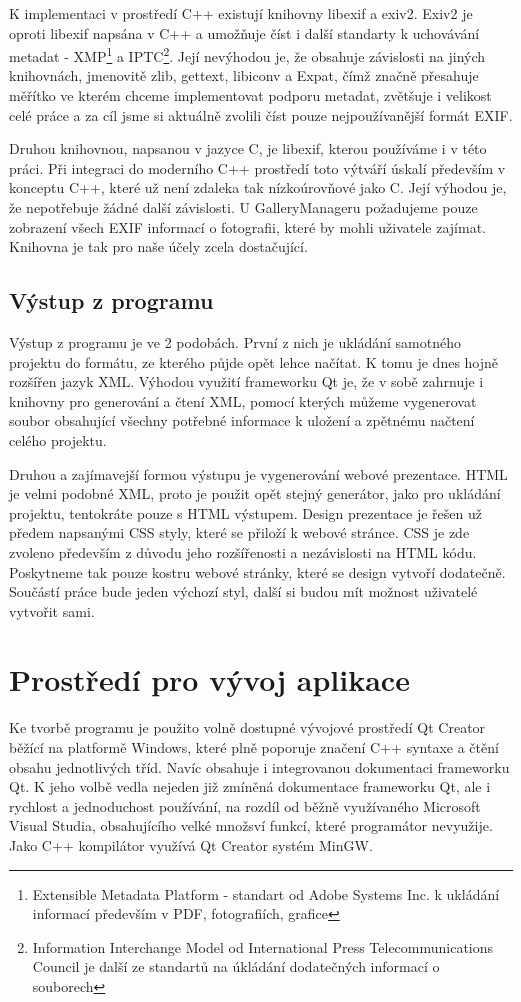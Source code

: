\documentclass[11pt,twoside,a4paper]{book}
\begin{document}
\indent
K implementaci v prostředí C++ existují knihovny libexif a exiv2. Exiv2 je oproti libexif napsána v C++ a umožňuje číst i další standarty k uchovávání metadat - XMP\footnote{Extensible Metadata Platform - standart od Adobe Systems Inc. k ukládání informací především v PDF, fotografiích, grafice} a IPTC\footnote{Information Interchange Model od International Press Telecommunications Council je další ze standartů na úkládání dodatečných informací o souborech}. Její nevýhodou je, že obsahuje závislosti na jiných knihovnách, jmenovitě zlib, gettext, libiconv a Expat, čímž značně přesahuje měřítko ve kterém chceme implementovat podporu metadat, zvětšuje i velikost celé práce a za cíl jsme si aktuálně zvolili číst pouze nejpoužívanější formát EXIF.

\indent
Druhou knihovnou, napsanou v jazyce C, je libexif\cite{libexif}, kterou používáme i v této práci. Při integraci do moderního C++ prostředí toto výtváří úskalí především v konceptu C++, které už není zdaleka tak nízkoúrovňové jako C. Její výhodou je, že nepotřebuje žádné další závislosti. U GalleryManageru požadujeme pouze zobrazení všech EXIF informací o fotografii, které by mohli uživatele zajímat. Knihovna je tak pro naše účely zcela dostačující.

\subsection{Výstup z programu}
\noindent
Výstup z programu je ve 2 podobách. První z nich je ukládání samotného projektu do formátu, ze kterého půjde opět lehce načítat. K tomu je dnes hojně rozšířen jazyk XML. Výhodou využití frameworku Qt je, že v sobě zahrnuje i knihovny pro generování a čtení XML, pomocí kterých můžeme vygenerovat soubor obsahující všechny potřebné informace k uložení a zpětnému načtení celého projektu.

\indent
Druhou a zajímavejší formou výstupu je vygenerování webové prezentace. HTML je velmi podobné XML, proto je použit opět stejný generátor, jako pro ukládání projektu, tentokráte pouze s HTML výstupem. Design prezentace je řešen už předem napsanými CSS styly, které se přiloží k webové stránce. CSS je zde zvoleno především z důvodu jeho rozšířenosti a nezávislosti na HTML kódu. Poskytneme tak pouze kostru webové stránky, které se design vytvoří dodatečně. Součástí práce bude jeden výchozí styl, další si budou mít možnost uživatelé vytvořit sami.


\section{Prostředí pro vývoj aplikace}
\noindent
Ke tvorbě programu je použito volně dostupné vývojové prostředí Qt Creator běžící na platformě Windows, které plně poporuje značení C++ syntaxe a čtění obsahu jednotlivých tříd. Navíc obsahuje i integrovanou dokumentaci frameworku Qt. K jeho volbě vedla nejeden již zmíněná dokumentace frameworku Qt, ale i rychlost a jednoduchost používání, na rozdíl od běžně využívaného Microsoft Visual Studia, obsahujícího velké množsví funkcí, které programátor nevyužije. Jako C++ kompilátor využívá Qt Creator systém MinGW.
\end{document}
